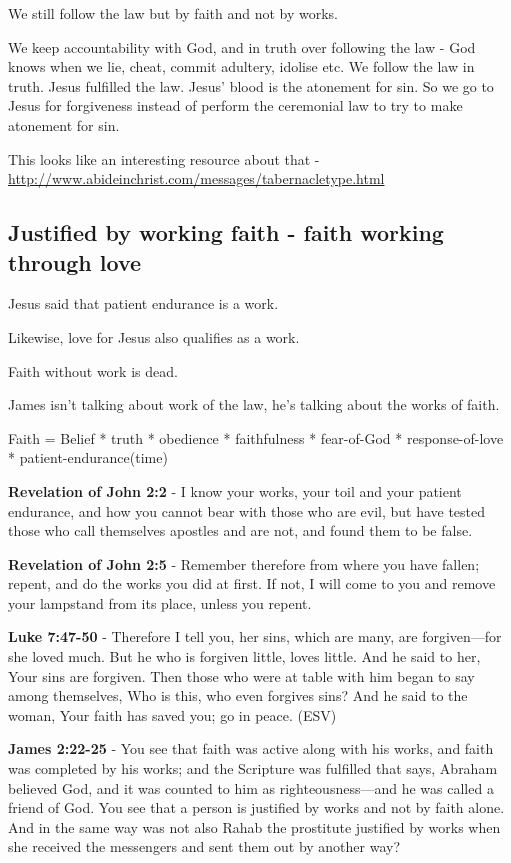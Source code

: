 \documentclass[11pt]{article}
\begin{document}
We still follow the law but by faith and not by works.

We keep accountability with God, and in truth over following the law - God knows when we lie, cheat, commit adultery, idolise etc.
We follow the law in truth.
Jesus fulfilled the law. Jesus' blood is the atonement for sin.
So we go to Jesus for forgiveness instead of perform the ceremonial law to try to make atonement for sin.

This looks like an interesting resource about that - \url{http://www.abideinchrist.com/messages/tabernacletype.html}

\subsection{Justified by working faith - faith working through love}
\label{sec:org7aaa25a}
Jesus said that patient endurance is a
work.

Likewise, love for Jesus also qualifies as a
work.

Faith without work is dead.

James isn't talking about work of the law, he's talking about the works of faith.

Faith = Belief * truth * obedience * faithfulness * fear-of-God * response-of-love * patient-endurance(time)


\textbf{Revelation of John 2:2} - I know your works, your toil and your patient endurance, and how you cannot bear with those who are evil, but have tested those who call themselves apostles and are not, and found them to be false.


\textbf{Revelation of John 2:5} - Remember therefore from where you have fallen; repent, and do the works you did at first. If not, I will come to you and remove your lampstand from its place, unless you repent.

\textbf{Luke 7:47-50} -  Therefore I tell you, her sins, which are many, are forgiven—for she loved much.  But he who is forgiven little, loves little.  And he said to her, Your sins are forgiven.  Then those who were at table with him began to say among themselves, Who is this, who even forgives sins?  And he said to the woman, Your faith has saved you; go in peace.  (ESV)

\textbf{James 2:22-25} - You see that faith was active along with his works, and faith was completed by his works; and the Scripture was fulfilled that says, Abraham believed God, and it was counted to him as righteousness—and he was called a friend of God.  You see that a person is justified by works and not by faith alone.  And in the same way was not also Rahab the prostitute justified by works when she received the messengers and sent them out by another way?
\end{document}
